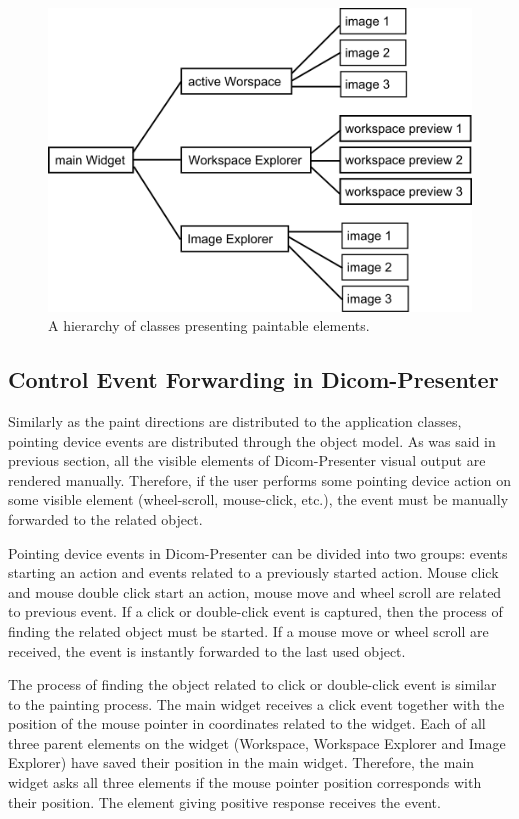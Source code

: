 \begin{figure}
	\caption{A hierarchy of classes presenting paintable elements.}
	\begin{center}
	\includegraphics[width=\textwidth]{Text/IMG/paint.png}
	\end{center}
	\label{hierarchy}
\end{figure}

\subsection{Control Event Forwarding in Dicom-Presenter}

Similarly as the paint directions are distributed to the application classes, pointing device events are distributed through the object model. As was said in previous section, all the visible elements of Dicom-Presenter visual output are rendered manually. Therefore, if the user performs some pointing device action on some visible element (wheel-scroll, mouse-click, etc.), the event must be manually forwarded to the related object.

Pointing device events in Dicom-Presenter can be divided into two groups: events starting an action and events related to a previously started action. Mouse click and mouse double click start an action, mouse move and wheel scroll are related to previous event. If a click or double-click event is captured, then the process of finding the related object must be started. If a mouse move or wheel scroll are received, the event is instantly forwarded to the last used object.

The process of finding the object related to click or double-click event is similar to the painting process. The main widget receives a click event together with the position of the mouse pointer in coordinates related to the widget. Each of all three parent elements on the widget (Workspace, Workspace Explorer and Image Explorer) have saved their position in the main widget. Therefore, the main widget asks all three elements if the mouse pointer position corresponds with their position. The element giving positive response receives the event.

